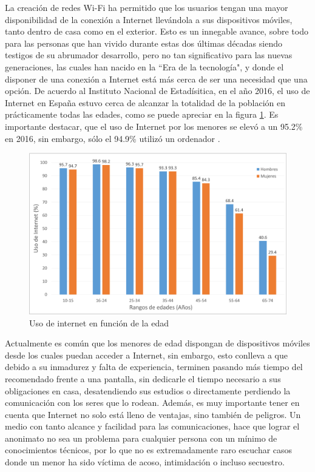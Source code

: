 \documentclass[12pt]{article}
\begin{document}
La creación de redes Wi-Fi ha permitido que los usuarios tengan una mayor disponibilidad de la conexión a Internet llevándola a sus dispositivos móviles, tanto dentro de casa como en el exterior. Esto es un innegable avance, sobre todo para las personas que han vivido durante estas dos últimas décadas siendo testigos de su abrumador desarrollo, pero no tan significativo para las nuevas generaciones, las cuales han nacido en la ``Era de la tecnología", y donde el disponer de una conexión a Internet está más cerca de ser una necesidad que una opción. De acuerdo al Instituto Nacional de Estadísitica, en el año 2016, el uso de Internet en España estuvo cerca de alcanzar la totalidad de la población en prácticamente todas las edades, como se puede apreciar en la figura \ref{fig:internet_ages}. Es importante destacar, que el uso de Internet por los menores se elevó a un 95.2\% en 2016, sin embargo, sólo el 94.9\% utilizó un ordenador \cite{EncuestaTIC}.

\begin{figure}[h!]
    \centering
        \includegraphics[scale=0.5]{internet_ages.eps}
        \caption{Uso de internet en función de la edad}
        \label{fig:internet_ages}
\end{figure}

Actualmente es común que los menores de edad dispongan de dispositivos móviles desde los cuales puedan acceder a Internet, sin embargo, esto conlleva a que debido a su inmadurez y falta de experiencia, terminen pasando más tiempo del recomendado frente a una pantalla, sin dedicarle el tiempo necesario a sus obligaciones en casa, desatendiendo sus estudios o directamente perdiendo la comunicación con los seres que lo rodean. Además, es muy importante tener en cuenta que Internet no solo está lleno de ventajas, sino también de peligros. Un medio con tanto alcance y facilidad para las comunicaciones, hace que lograr el anonimato no sea un problema para cualquier persona con un mínimo de conocimientos técnicos, por lo que no es extremadamente raro escuchar casos donde un menor ha sido víctima de acoso, intimidación o incluso secuestro.
\end{document}

